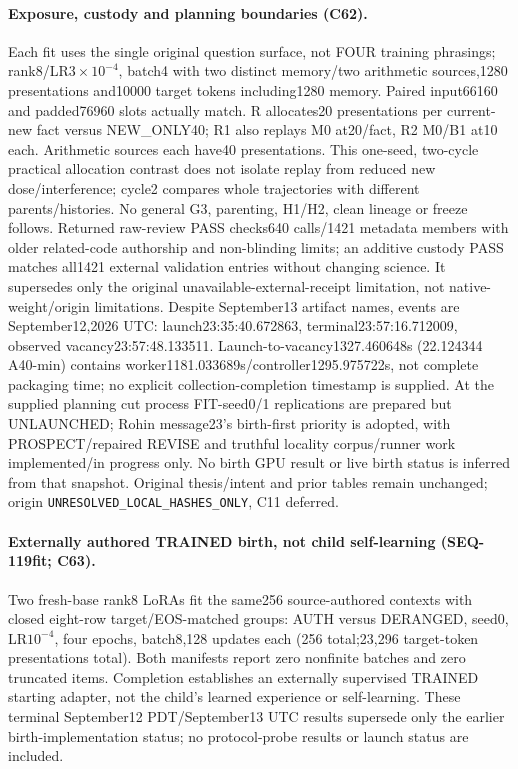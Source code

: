 \documentclass{article}
\begin{document}
\paragraph{Exposure, custody and planning boundaries (C62).} Each fit uses the single original question surface, not FOUR training phrasings; rank8/LR$3\times10^{-4}$, batch4 with two distinct memory/two arithmetic sources,1280 presentations and10000 target tokens including1280 memory. Paired input66160 and padded76960 slots actually match. R allocates20 presentations per current-new fact versus NEW\_ONLY40; R1 also replays M0 at20/fact, R2 M0/B1 at10 each. Arithmetic sources each have40 presentations. This one-seed, two-cycle practical allocation contrast does not isolate replay from reduced new dose/interference; cycle2 compares whole trajectories with different parents/histories. No general G3, parenting, H1/H2, clean lineage or freeze follows. Returned raw-review PASS checks640 calls/1421 metadata members with older related-code authorship and non-blinding limits; an additive custody PASS matches all1421 external validation entries without changing science. It supersedes only the original unavailable-external-receipt limitation, not native-weight/origin limitations. Despite September13 artifact names, events are September12,2026 UTC: launch23:35:40.672863, terminal23:57:16.712009, observed vacancy23:57:48.133511. Launch-to-vacancy1327.460648s (22.124344 A40-min) contains worker1181.033689s/controller1295.975722s, not complete packaging time; no explicit collection-completion timestamp is supplied. At the supplied planning cut process FIT-seed0/1 replications are prepared but UNLAUNCHED; Rohin message23's birth-first priority is adopted, with PROSPECT/repaired REVISE and truthful locality corpus/runner work implemented/in progress only. No birth GPU result or live birth status is inferred from that snapshot. Original thesis/intent and prior tables remain unchanged; origin \texttt{UNRESOLVED\_LOCAL\_HASHES\_ONLY}, C11 deferred.

\paragraph{Externally authored TRAINED birth, not child self-learning (SEQ-119fit; C63).}
Two fresh-base rank8 LoRAs fit the same256 source-authored contexts with closed
eight-row target/EOS-matched groups: AUTH versus DERANGED, seed0, LR$10^{-4}$,
four epochs, batch8,128 updates each (256 total;23{,}296 target-token
presentations total). Both manifests report zero nonfinite batches and zero
truncated items. Completion establishes an externally supervised TRAINED
starting adapter, not the child's learned experience or self-learning.
These terminal September12 PDT/September13 UTC results supersede only the
earlier birth-implementation status; no protocol-probe results or launch status
are included.
\end{document}
